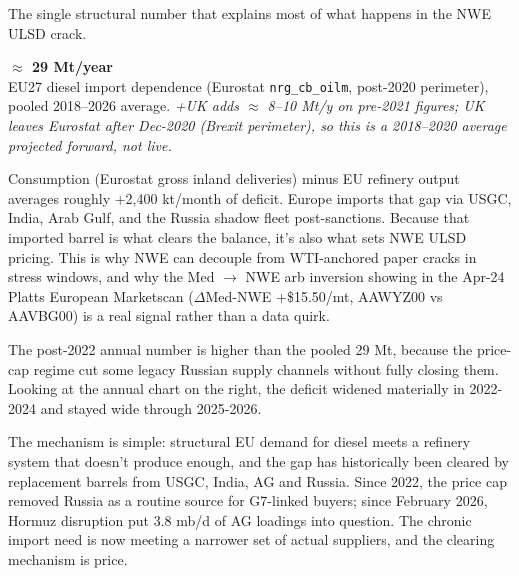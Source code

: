 \documentclass[10pt,a4paper]{article}
\newcommand{\bignum}[2]{\textcolor{obred}{\LARGE\bfseries #1}\\[-2pt]\textcolor{obgrey}{\small #2}}
\begin{document}
\noindent\begin{minipage}[t]{0.45\linewidth}\vspace{0pt}

The single structural number that explains most of what happens in the \mbox{NWE} ULSD crack.

\begin{center}
\bignum{$\approx$ 29 Mt/year}{EU27 diesel import dependence (Eurostat \texttt{nrg\_cb\_oilm}, post-2020 perimeter), pooled 2018--2026 average. \emph{+UK adds $\approx$ 8--10 Mt/y on pre-2021 figures; UK leaves Eurostat after Dec-2020 (Brexit perimeter), so this is a 2018--2020 average projected forward, not live.}}
\end{center}

\vspace{0.2cm}

Consumption (Eurostat gross inland deliveries) minus EU refinery output averages roughly +2,400 kt/month of deficit. Europe imports that gap via USGC, India, Arab Gulf, and the Russia shadow fleet post-sanctions. Because that imported barrel is what clears the balance, it's also what sets \mbox{NWE} ULSD pricing. This is why \mbox{NWE} can decouple from \mbox{WTI}-anchored paper cracks in stress windows, and why the Med $\rightarrow$ \mbox{NWE} arb inversion showing in the Apr-24 Platts European Marketscan ($\Delta$Med-NWE +\$15.50/mt, AAWYZ00 vs AAVBG00) is a real signal rather than a data quirk.

The post-2022 annual number is higher than the pooled 29 Mt, because the price-cap regime cut some legacy Russian supply channels without fully closing them. Looking at the annual chart on the right, the deficit widened materially in 2022-2024 and stayed wide through 2025-2026.

The mechanism is simple: structural EU demand for diesel meets a refinery system that doesn't produce enough, and the gap has historically been cleared by replacement barrels from USGC, India, AG and Russia. Since 2022, the price cap removed Russia as a routine source for G7-linked buyers; since February 2026, Hormuz disruption put 3.8 mb/d of AG loadings into question. The chronic import need is now meeting a narrower set of actual suppliers, and the clearing mechanism is price.

\end{minipage}\hfill
\end{document}
